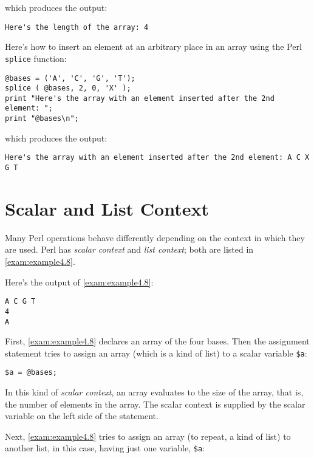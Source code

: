 which produces the output:

\begin{lstlisting}
Here's the length of the array: 4
\end{lstlisting}

Here's how to insert an element at an arbitrary place in an array using the Perl \verb|splice| function: 

\begin{lstlisting}
@bases = ('A', 'C', 'G', 'T');
splice ( @bases, 2, 0, 'X' );
print "Here's the array with an element inserted after the 2nd element: ";
print "@bases\n";
\end{lstlisting}

which produces the output:

\begin{lstlisting}
Here's the array with an element inserted after the 2nd element: A C X G T
\end{lstlisting}

\section{Scalar and List Context}
Many Perl operations behave differently depending on the context in which they are used. Perl has \textit{scalar context} and \textit{list context}; both are listed in \autoref{exam:example4.8}.



Here's the output of \autoref{exam:example4.8}:

\begin{lstlisting}
A C G T
4
A
\end{lstlisting}

First, \autoref{exam:example4.8} declares an array of the four bases. Then the assignment statement tries to assign an array (which is a kind of list) to a scalar variable \verb|$a|: 

\begin{lstlisting}
$a = @bases;
\end{lstlisting}

In this kind of \textit{scalar context}, an array evaluates to the size of the array, that is, the number of elements in the array. The scalar context is supplied by the scalar variable on the left side of the statement.

Next, \autoref{exam:example4.8} tries to assign an array (to repeat, a kind of list) to another list, in this case, having just one variable, \verb|$a|:

